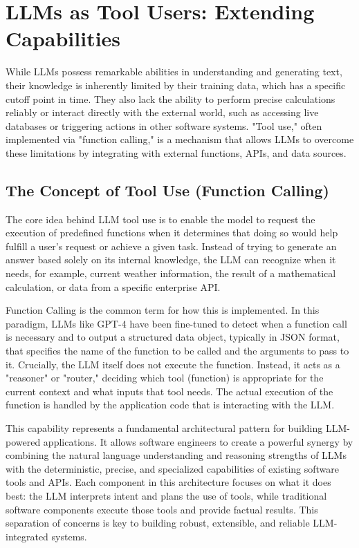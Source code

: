 \chapter{LLMs as Tool Users: Extending Capabilities}

While LLMs possess remarkable abilities in understanding and generating text, their knowledge is inherently limited by their training data, 
which has a specific cutoff point in time. They also lack the ability to perform precise calculations reliably or interact directly with the external world, 
such as accessing live databases or triggering actions in other software systems. "Tool use," often implemented via "function calling," is a 
mechanism that allows LLMs to overcome these limitations by integrating with external functions, APIs, and data sources.

\section{The Concept of Tool Use (Function Calling)}

The core idea behind LLM tool use is to enable the model to request the execution of predefined functions when it determines that doing so would help 
fulfill a user's request or achieve a given task. Instead of trying to generate an answer based solely on its internal knowledge, the LLM can recognize when it needs, 
for example, current weather information, the result of a mathematical calculation, or data from a specific enterprise API.

Function Calling is the common term for how this is implemented. In this paradigm, LLMs like GPT-4 have been fine-tuned to detect when a function call is necessary 
and to output a structured data object, typically in JSON format, that specifies the name of the function to be called and the arguments to pass to it. 
Crucially, the LLM itself does not execute the function. Instead, it acts as a "reasoner" or "router," deciding which tool (function) is appropriate for 
the current context and what inputs that tool needs. The actual execution of the function is handled by the application code that is interacting with the LLM.

This capability represents a fundamental architectural pattern for building LLM-powered applications. It allows software engineers to create a powerful synergy 
by combining the natural language understanding and reasoning strengths of LLMs with the deterministic, precise, and specialized capabilities of existing software 
tools and APIs. Each component in this architecture focuses on what it does best: the LLM interprets intent and plans the use of tools, while traditional software 
components execute those tools and provide factual results. This separation of concerns is key to building robust, extensible, and reliable LLM-integrated systems.

